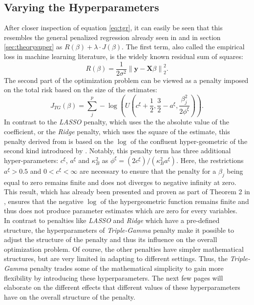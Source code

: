 \documentclass[12pt,a4paper]{article}
\newcommand{\norm}[1]{\left\lVert#1\right\rVert}
\begin{document}
\subsection{Varying the Hyperparameters}
After closer inspection of equation \ref{eq:tgr}, it can easily be seen that this resembles the general penalized regression already seen in \textcite[398]{ESL2009} and in section \ref{sec:theorysuper} as $R(\beta) + \lambda\cdot J(\beta)$. The first term, also called the empirical loss in machine learning literature, is the widely known residual sum of squares:
\[
R(\beta)=\frac{1}{2\sigma^2}\norm{\mathbf{y} - \mathbf{X}\beta}_2^2.
\] 
The second part of the optimization problem can be viewed as a penalty imposed on the total risk based on the size of the estimates:
\[
J_{TG}(\beta) = \sum_j^p -\log\left(U\left(c^\xi + \frac{1}{2}, \frac{3}{2}-a^\xi, \frac{\beta_j^2}{2\phi^\xi}\right)\right).
\]
In contrast to the \textit{LASSO} penalty, which uses the the absolute value of the coefficient, or the \textit{Ridge} penalty, which uses the square of the estimate, this penalty derived from \textcite{TGP2020} is based on the $\log$ of the confluent hyper-geometric of the second kind introduced by \textcite{Tricomi1947}. Notably, this penalty term has three additional hyper-parameters: $c^\xi$, $a^\xi$ and $\kappa_B^2$ as $\phi^\xi = (2c^\xi)/(\kappa^2_B a^\xi)$. Here, the restrictions $a^\xi>0.5$ and $0 < c^\xi < \infty$ are necessary to ensure that the penalty for a $\beta_j$ being equal to zero remains finite and does not diverges to negative infinity at zero. This result, which has already been presented and proven as part of Theorem 2 in \textcite[5--6]{TGP2020}, ensures that the negative $\log$ of the hypergeometric function remains finite and thus does not produce parameter estimates which are zero for every variables.\\

In contrast to penalties like \textit{LASSO} and \textit{Ridge} which have a pre-defined structure, the hyperparameters of \textit{Triple-Gamma} penalty make it possible to adjust the structure of the penalty and thus its influence on the overall optimization problem. Of course, the other penalties have simpler mathematical structures, but are very limited in adapting to different settings. Thus, the \textit{Triple-Gamma} penalty trades some of the mathematical simplicity to gain more flexibility by introducing these hyperparameters. The next few pages will elaborate on the different effects that different values of these hyperparameters have on the overall structure of the penalty.    
\end{document}
